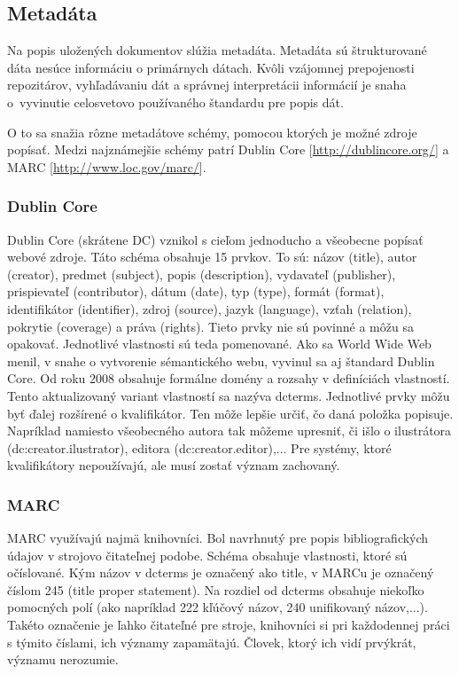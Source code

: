 \documentclass[thesis=M,slovak]{FITthesis}[2013/05/06]
\begin{document}
\subsection{Metadáta}
Na popis uložených dokumentov slúžia metadáta. Metadáta sú štrukturované dáta nesúce informáciu o primárnych dátach.\cite{iso8459-5} Kvôli vzájomnej prepojenosti repozitárov, vyhľadávaniu dát a správnej interpretácii informácií je snaha o~vyvinutie celosvetovo používaného štandardu pre popis dát.

O to sa snažia rôzne metadátove schémy, pomocou ktorých je možné zdroje popísať. Medzi najznámejšie schémy patrí Dublin Core [\url{http://dublincore.org/}] a MARC [\url{http://www.loc.gov/marc/}].

\subsubsection{Dublin Core}
Dublin Core (skrátene DC) vznikol s cieľom jednoducho a všeobecne popísať webové zdroje. Táto schéma obsahuje 15  prvkov. To sú: názov (title), autor (creator), predmet (subject), popis (description), vydavateľ (publisher), prispievateľ (contributor), dátum (date), typ (type), formát (format), identifikátor (identifier), zdroj (source), jazyk (language), vzťah (relation), pokrytie (coverage) a práva (rights). Tieto prvky nie sú povinné a môžu sa opakovať. Jednotlivé vlastnosti sú teda pomenované. Ako sa World Wide Web menil, v snahe o vytvorenie sémantického webu, vyvinul sa aj štandard Dublin Core. Od roku 2008 obsahuje formálne domény a rozsahy v definíciách vlastností. Tento aktualizovaný variant vlastností sa nazýva dcterms. Jednotlivé prvky môžu byť ďalej rozšírené o kvalifikátor. Ten môže lepšie určiť, čo daná položka popisuje. Napríklad namiesto všeobecného autora tak môžeme upresniť, či išlo o ilustrátora (dc:creator.ilustrator), editora (dc:creator.editor),...  Pre systémy, ktoré kvalifikátory nepoužívajú, ale musí zostať význam zachovaný.

\subsubsection{MARC}
MARC využívajú najmä knihovníci. Bol navrhnutý pre popis bibliografických údajov v strojovo čitateľnej podobe.
Schéma obsahuje vlastnosti, ktoré sú očíslované. Kým názov v dcterms je označený ako title, v MARCu  je označený číslom 245 (title proper statement). Na rozdiel od dcterms obsahuje niekoľko pomocných polí (ako napríklad 222 kľúčový názov, 240 unifikovaný názov,...). Takéto označenie je ľahko čitateľné pre stroje, knihovníci si pri každodennej práci s týmito číslami, ich významy zapamätajú. Človek, ktorý ich vidí prvýkrát, významu nerozumie.
\end{document}
